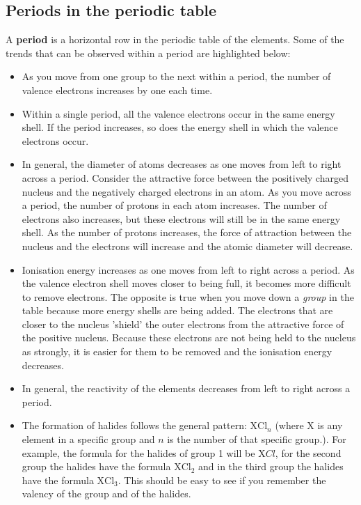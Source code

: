             \subsection*{Periods in the periodic table}
            \nopagebreak
            \label{m38760*id261855}A \textbf{period} is a horizontal row in the periodic table of the elements. Some of the trends that can be observed within a period are highlighted below:\par 
        \label{m38760*id261865}\begin{itemize}[noitemsep]
            \label{m38760*uid147}\item As you move from one group to the next within a period, the number of valence electrons increases by one each time.
\label{m38760*uid148}\item Within a single period, all the valence electrons occur in the same energy shell. If the period increases, so does the energy shell in which the valence electrons occur.
\label{m38760*uid149}\item In general, the diameter of atoms decreases as one moves from left to right across a period. Consider the attractive force between the positively charged nucleus and the negatively charged electrons in an atom. As you move across a period, the number of protons in each atom increases. The number of electrons also increases, but these electrons will still be in the same energy shell. As the number of protons increases, the force of attraction between the nucleus and the electrons will increase and the atomic diameter will decrease.
\label{m38760*uid150}\item Ionisation energy increases as one moves from left to right across a period. As the valence electron shell moves closer to being full, it becomes more difficult to remove electrons. The opposite is true when you move down a \textsl{group} in the table because more energy shells are being added. The electrons that are closer to the nucleus 'shield' the outer electrons from the attractive force of the positive nucleus. Because these electrons are not being held to the nucleus as strongly, it is easier for them to be removed and the ionisation energy decreases.
\label{m38760*uid151}\item In general, the reactivity of the elements decreases from left to right across a period.
\label{m38760*id7634}\item The formation of halides follows the general pattern: $\mathrm{X}{\mathrm{Cl}}_{n}$ (where $\mathrm{X}$ is any element in a specific group and $n$ is the number of that specific group.). For example, the formula for the halides of group 1 will be $\mathrm{X}Cl$, for the second group the halides have the formula $\mathrm{X}{\mathrm{Cl}}_{2}$ and in the third group the halides have the formula $\mathrm{X}{\mathrm{Cl}}_{3}$. This should be easy to see if you remember the valency of the group and of the halides.
\end{itemize}
